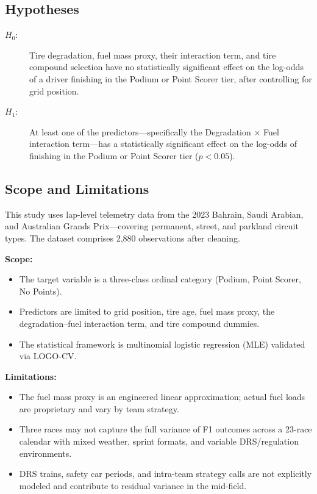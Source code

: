 \subsection{Hypotheses}

\begin{description}
  \item[$H_{0}$:] Tire degradation, fuel mass proxy, their interaction term,
    and tire compound selection have no statistically significant effect on
    the log-odds of a driver finishing in the Podium or Point Scorer tier,
    after controlling for grid position.
  \item[$H_{1}$:] At least one of the predictors---specifically the
    Degradation $\times$ Fuel interaction term---has a statistically
    significant effect on the log-odds of finishing in the Podium or Point
    Scorer tier ($p < 0.05$).
\end{description}

\subsection{Scope and Limitations}

This study uses lap-level telemetry data from the 2023 Bahrain, Saudi Arabian,
and Australian Grands Prix---covering permanent, street, and parkland circuit
types. The dataset comprises 2,880 observations after cleaning.

\textbf{Scope:}
\begin{itemize}
  \item The target variable is a three-class ordinal category (Podium, Point
    Scorer, No Points).
  \item Predictors are limited to grid position, tire age, fuel mass proxy,
    the degradation--fuel interaction term, and tire compound dummies.
  \item The statistical framework is multinomial logistic regression (MLE)
    validated via LOGO-CV.
\end{itemize}

\textbf{Limitations:}
\begin{itemize}
  \item The fuel mass proxy is an engineered linear approximation; actual fuel
    loads are proprietary and vary by team strategy.
  \item Three races may not capture the full variance of F1 outcomes across a
    23-race calendar with mixed weather, sprint formats, and variable
    DRS/regulation environments.
  \item DRS trains, safety car periods, and intra-team strategy calls are not
    explicitly modeled and contribute to residual variance in the mid-field.
\end{itemize}

